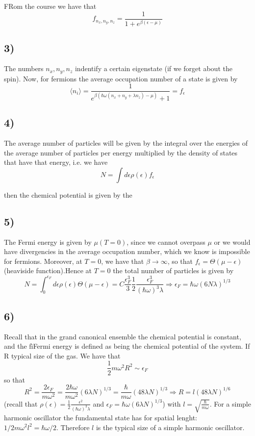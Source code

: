 \documentclass[10pt,a4paper]{book}
\begin{document}
FRom the course we have that
$$f_{n_x,n_y,n_z}=\frac{1}{1+e^{\beta(\epsilon-\mu)}}$$

\subsection*{3)}
The numbers $n_x,n_y,n_z$ indentify a certain eigenstate (if we forget about the spin). Now, for fermions the average occupation number of a state is given by 
$$\langle n_i\rangle =\frac{1}{e^{\beta(\hbar\omega(n_x+n_y+\lambda n_z)-\mu)}+1}=f_{\epsilon}$$

\subsection*{4)}
The average number of particles will be given by the integral over the energies of the average number of particles per energy multiplied by the density of states that have that energy, i.e. we have 
$$N=\int d\epsilon\rho(\epsilon) f_{\epsilon}$$

then the chemical potential is given by the 

\subsection*{5)}
The Fermi energy is given by $\mu(T=0)$, since we cannot overpass $\mu$ or we would have divergencies in the average occupation number, which we know is impossible for fermions. Moreover, at $T=0$, we have that $\beta\to\infty$, so that $f_{\epsilon}=\Theta(\mu-\epsilon)$ (heaviside function).Hence at $T=0$ the total number of particles is given by 
$$N=\int_0^{\epsilon_F}d\epsilon\rho(\epsilon)\Theta(\mu-\epsilon) =C\frac{\epsilon_F^3}{3}\frac{1}{2}\frac{\epsilon_F^3}{(\hbar\omega)^3\lambda}\Rightarrow \epsilon_F=\hbar\omega(6N\lambda)^{1/3}$$

\subsection*{6)}
Recall that in the grand canonical ensemble the chemical potential is constant, and the fìFermi energy is defined as being the chemical potential of the system. If R typical size of the gas. We have that
$$\frac{1}{2}m\omega^2R^2\sim\epsilon_F$$ so that
$$R^2=\frac{2\epsilon_F}{m\omega^2}=\frac{2\hbar\omega}{m\omega^2}(6\lambda N)^{1/3}=\frac{\hbar}{m\omega}(48\lambda N)^{1/3}\Rightarrow R=l(48\lambda N)^{1/6}$$ (recall that $\rho(\epsilon)=\frac{1}{2}\frac{\epsilon^2}{(\hbar\omega)^3\lambda}$ and $\epsilon_F=\hbar\omega(6\lambda N)^{1/3}$) with $l=\sqrt{\frac{\hbar}{m\omega}}$. For a simple harmonic oscillator the fundamental state has for spatial lenght: $1/2 m\omega^2 l^2=\hbar\omega/2$. Therefore $l$ is the typical size of a simple harmonic oscillator.
\end{document}
